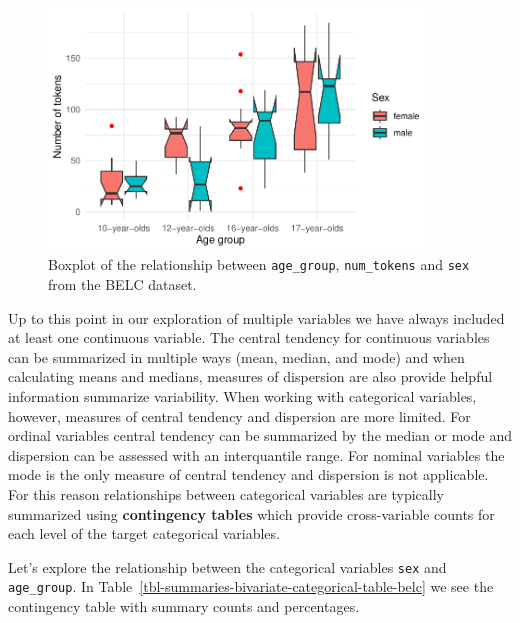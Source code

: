 \documentclass[
  letterpaper,
]{latex/krantz}
\begin{document}
\begin{figure}

{\centering \includegraphics[width=0.9\textwidth,height=\textheight]{./approaching-analysis_files/figure-pdf/fig-summaries-multivariate-boxplots-belc-1.pdf}

}

\caption{\label{fig-summaries-multivariate-boxplots-belc}Boxplot of the
relationship between \texttt{age\_group}, \texttt{num\_tokens} and
\texttt{sex} from the BELC dataset.}

\end{figure}

Up to this point in our exploration of multiple variables we have always
included at least one continuous variable. The central tendency for
continuous variables can be summarized in multiple ways (mean, median,
and mode) and when calculating means and medians, measures of dispersion
are also provide helpful information summarize variability. When working
with categorical variables, however, measures of central tendency and
dispersion are more limited. For ordinal variables central tendency can
be summarized by the median or mode and dispersion can be assessed with
an interquantile range. For nominal variables the mode is the only
measure of central tendency and dispersion is not applicable. For this
reason relationships between categorical variables are typically
summarized using \textbf{contingency tables} which provide
cross-variable counts for each level of the target categorical
variables.

Let's explore the relationship between the categorical variables
\texttt{sex} and \texttt{age\_group}. In
Table~\ref{tbl-summaries-bivariate-categorical-table-belc} we see the
contingency table with summary counts and percentages.
\end{document}

